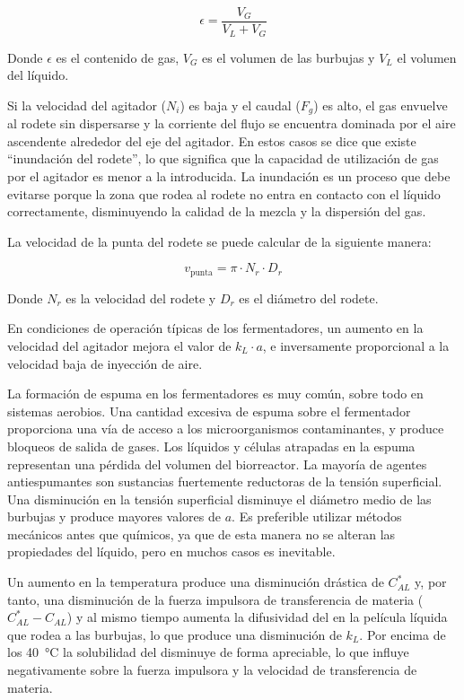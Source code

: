 \documentclass{AsignaturaResumen}
\begin{document}
\begin{equation}
    \epsilon = \frac{V_{G}}{V_{L} + V_{G}} %
\end{equation}

Donde $\epsilon$ es el contenido de gas, $V_{G}$ es el volumen de las burbujas y $V_{L}$ el volumen del líquido.

Si la velocidad del agitador ($N_{i}$) es baja y el caudal ($F_{g}$) es alto, el gas envuelve al rodete sin dispersarse y la corriente del flujo se encuentra dominada por el aire ascendente alrededor del eje del agitador. En estos casos se dice que existe ``inundación del rodete'', lo que significa que la capacidad de utilización de gas por el agitador es menor a la introducida. La inundación es un proceso que debe evitarse porque la zona que rodea al rodete no entra en contacto con el líquido correctamente, disminuyendo la calidad de la mezcla y la dispersión del gas. 

La velocidad de la punta del rodete se puede calcular de la siguiente manera:

\begin{equation}
    v_\text{punta} = \pi \cdot N_{r} \cdot D_{r}
\end{equation}

Donde $N_{r}$ es la velocidad del rodete y $D_{r}$ es el diámetro del rodete.

En condiciones de operación típicas de los fermentadores, un aumento en la velocidad del agitador mejora el valor de $k_{L}\cdot a$, e inversamente proporcional a la velocidad baja de inyección de aire. 

La formación de espuma en los fermentadores es muy común, sobre todo en sistemas aerobios. Una cantidad excesiva de espuma sobre el fermentador proporciona una vía de acceso a los microorganismos contaminantes, y produce bloqueos de salida de gases. Los líquidos y células atrapadas en la espuma representan una pérdida del volumen del biorreactor. La mayoría de agentes antiespumantes son sustancias fuertemente reductoras de la tensión superficial. Una disminución en la tensión superficial disminuye el diámetro medio de las burbujas y produce mayores valores de $a$. Es preferible utilizar métodos mecánicos antes que químicos, ya que de esta manera no se alteran las propiedades del líquido, pero en muchos casos es inevitable.

Un aumento en la temperatura produce una disminución drástica de $C_{AL}^{\ast}$ y, por tanto, una disminución de la fuerza impulsora de transferencia de materia ($C_{AL}^{\ast} - C_{AL}$) y al mismo tiempo aumenta la difusividad del  en la película líquida que rodea a las burbujas, lo que produce una disminución de $k_{L}$. Por encima de los \qty{40}{\degreeCelsius} la solubilidad del  disminuye de forma apreciable, lo que influye negativamente sobre la fuerza impulsora y la velocidad de transferencia de materia.
\end{document}
